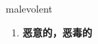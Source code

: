 
\begin{frame}
{\huge malevolent}
\begin{center}
\begin{enumerate}\Large
  \item \textbf{恶意的，恶毒的}
\end{enumerate}
\end{center}
\end{frame}
